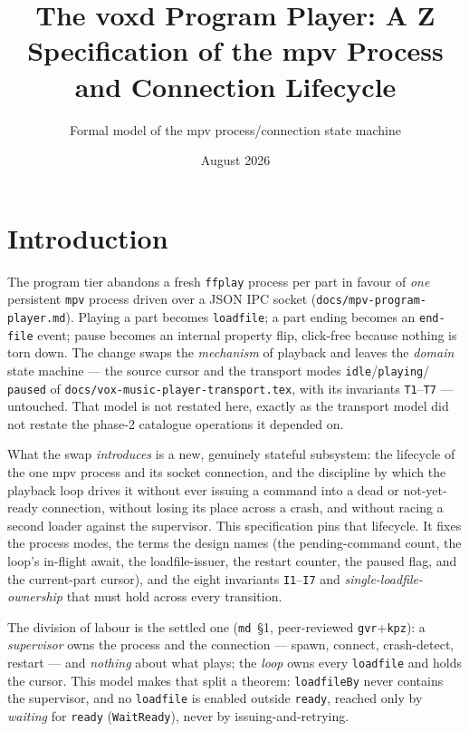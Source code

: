 \documentclass[a4paper,10pt,fleqn]{article}
\begin{document}
\title{The voxd Program Player: A Z Specification of the mpv Process and
Connection Lifecycle}
\author{Formal model of the mpv process/connection state machine}
\date{August 2026}
\maketitle

\section{Introduction}

The program tier abandons a fresh \texttt{ffplay} process per part in favour of
\emph{one} persistent \texttt{mpv} process driven over a JSON IPC socket
(\texttt{docs/mpv-program-player.md}). Playing a part becomes \texttt{loadfile};
a part ending becomes an \texttt{end-file} event; pause becomes an internal
property flip, click-free because nothing is torn down. The change swaps the
\emph{mechanism} of playback and leaves the \emph{domain} state machine ---
the source cursor and the transport modes \texttt{idle}/\texttt{playing}/%
\texttt{paused} of \texttt{docs/vox-music-player-transport.tex}, with its
invariants \texttt{T1}--\texttt{T7} --- untouched. That model is not restated
here, exactly as the transport model did not restate the phase-2 catalogue
operations it depended on.

What the swap \emph{introduces} is a new, genuinely stateful subsystem: the
lifecycle of the one mpv process and its socket connection, and the discipline
by which the playback loop drives it without ever issuing a command into a dead
or not-yet-ready connection, without losing its place across a crash, and
without racing a second loader against the supervisor. This specification pins
that lifecycle. It fixes the process modes, the terms the design names
(the pending-command count, the loop's in-flight await, the loadfile-issuer,
the restart counter, the paused flag, and the current-part cursor), and the
eight invariants \texttt{I1}--\texttt{I7} and \emph{single-loadfile-ownership}
that must hold across every transition.

The division of labour is the settled one (\texttt{md}~\S1, peer-reviewed
\texttt{gvr}+\texttt{kpz}): a \emph{supervisor} owns the process and the
connection --- spawn, connect, crash-detect, restart --- and \emph{nothing}
about what plays; the \emph{loop} owns every \texttt{loadfile} and holds the
cursor. This model makes that split a theorem: \texttt{loadfileBy} never
contains the supervisor, and no \texttt{loadfile} is enabled outside
\texttt{ready}, reached only by \emph{waiting} for \texttt{ready}
(\texttt{WaitReady}), never by issuing-and-retrying.
\end{document}
